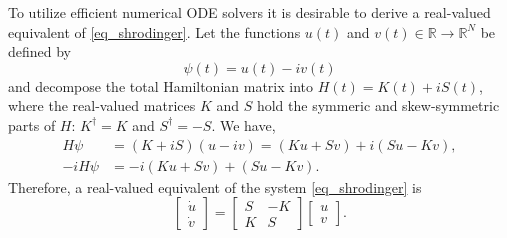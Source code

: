 \documentclass[11pt]{article}
\begin{document}
To utilize efficient numerical ODE solvers it is desirable to derive a real-valued equivalent of
\eqref{eq_shrodinger}. Let the functions $u(t)$ and $v(t) \in \mathbb{R} \to \mathbb{R}^N$ be
defined by
\[
\psi(t) = u(t) - iv(t)
\]
and decompose the total Hamiltonian matrix into $H(t) = K(t) + i S(t)$, where the real-valued
matrices $K$ and $S$ hold the symmeric and skew-symmetric parts of $H$: $K^\dag = K$ and $S^\dag =
-S$. We have,
\begin{align*}
H\psi &= (K+iS)(u - iv) = (Ku + Sv) + i(Su - Kv),\\
-iH\psi &= -i(Ku + Sv) + (Su - Kv).
\end{align*}
Therefore, a real-valued equivalent of the system \eqref{eq_shrodinger} is
\begin{equation}\label{eq_real-shrodinger}
  \begin{bmatrix} \dot{u}\\ \dot{v} \end{bmatrix} =
%
  \begin{bmatrix}
    S & -K \\ K & S
  \end{bmatrix}     
  \begin{bmatrix} u\\ v \end{bmatrix} .
\end{equation}
\end{document}
